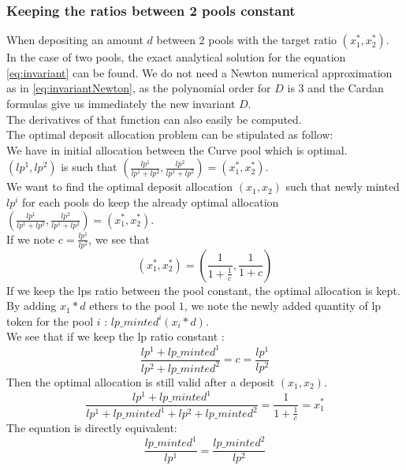 \documentclass[conference]{IEEEtran}
\begin{document}
\subsubsection{Keeping the ratios between 2 pools constant}
When depositing an amount $d$ between 2 pools with the target ratio $(x_1^*,x_2^*)$.\\
In the case of two pools, the exact analytical solution for the equation  \ref{eq:invariant} can be found. We do not need a Newton numerical approximation as in \ref{eq:invariantNewton}, as the polynomial order for $D$ is $3$ and the Cardan formulas give us immediately the new invariant $D$.\\
The derivatives of that function can also easily be computed.\\
The optimal deposit allocation problem can be stipulated as follow:\\
We have in initial allocation between the Curve pool which is optimal.\\
$(lp^1, lp^2)$ is such that $(\frac{lp^1}{lp^1+lp^2},\frac{lp^2}{lp^1+lp^2}) = (x_1^*,x_2^*)$.\\
We want to find the optimal deposit allocation $(x_1,x_2)$ such that newly minted $lp^i$ for each pools do keep the already optimal allocation $(\frac{lp^1}{lp^1+lp^2},\frac{lp^2}{lp^1+lp^2}) = (x_1^*,x_2^*)$.\\
If we note $c = \frac{lp^1}{lp^2}$, we see that 
\begin{equation}\label{eq:poolratio}
(x_1^*,x_2^*) = (\frac{1}{1+\frac{1}{c}},\frac{1}{1+c})
\end{equation}
If we keep the lps ratio between the pool constant, the optimal allocation is kept.\\
By adding $x_1*d$ ethers to the pool $1$, we note the newly added quantity of lp token for the pool $i$ : $lp\_minted^i(x_i * d )$.\\
We see that if we keep the lp ratio constant :
\begin{equation}\label{eq:cst}
 \frac{lp^1 +lp\_minted^1}{lp^2 +lp\_minted^2}=c=\frac{lp^1}{lp^2}
\end{equation}
Then the optimal allocation is still valid after a deposit $(x_1,x_2)$.
\begin{equation}
    \frac{lp^1 +lp\_minted^1}{lp^1 +lp\_minted^1 + lp^2 +lp\_minted^2}  = \frac{1}{1+\frac{1}{c}} = x_1^* 
\end{equation}
The equation \label{eq:cst} is directly equivalent:
\begin{equation}
  \frac{lp\_minted^1}{lp^1}  =  \frac{lp\_minted^2}{lp^2}
\end{equation}
\end{document}
